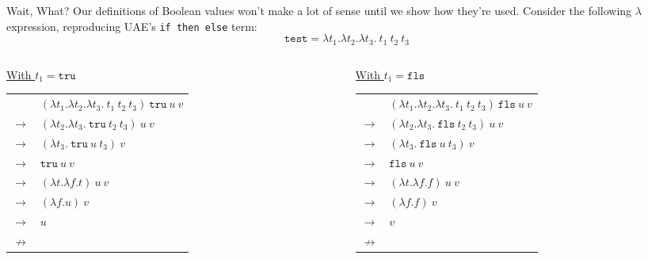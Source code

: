 \documentclass[11pt]{beamer}
\begin{document}
\begin{frame}[fragile=singleslide]{Wait, What?}
Our definitions of Boolean values won't make a lot of sense until we show how they're used.  Consider the following $\lambda$ expression, reproducing UAE's \texttt{if then else} term:
\begin{equation}
\texttt{test} = \lambda t_1. \lambda t_2. \lambda t_3.\:t_1\:t_2\:t_3
\end{equation}

\begin{columns}
\begin{column}{0.5\textwidth}
\begin{center}
\underline{With $t_1 = \texttt{tru}$}
\begin{tabular}{c l}
& $(\lambda t_1. \lambda t_2. \lambda t_3.\:t_1\:t_2\:t_3)\:\texttt{tru}\:u\:v$ \\ 
$\rightarrow$ & $(\lambda t_2.\lambda t_3.\:\texttt{tru}\:t_2\:t_3)\:u\:v$ \\
$\rightarrow$ & $(\lambda t_3.\:\texttt{tru}\:u\:t_3)\:v$ \\
$\rightarrow$ & $\texttt{tru}\:u\:v$ \\
$\rightarrow$ & $(\lambda t. \lambda f. t)\:u\:v$ \\
$\rightarrow$ & $(\lambda f. u)\:v$ \\
$\rightarrow$ & $u$ \\
$\nrightarrow$ & \\
\end{tabular}
\end{center}

\end{column}
\begin{column}{0.5\textwidth}
\begin{center}
\underline{With $t_1 = \texttt{fls}$}
\begin{tabular}{c l}
& $(\lambda t_1. \lambda t_2. \lambda t_3.\:t_1\:t_2\:t_3)\:\texttt{fls}\:u\:v$ \\ 
$\rightarrow$ & $(\lambda t_2.\lambda t_3.\:\texttt{fls}\:t_2\:t_3)\:u\:v$ \\
$\rightarrow$ & $(\lambda t_3.\:\texttt{fls}\:u\:t_3)\:v$ \\
$\rightarrow$ & $\texttt{fls}\:u\:v$ \\
$\rightarrow$ & $(\lambda t. \lambda f. f)\:u\:v$ \\
$\rightarrow$ & $(\lambda f. f)\:v$ \\
$\rightarrow$ & $v$ \\
$\nrightarrow$ & \\
\end{tabular}
\end{center}
\end{column}
\end{columns}
\end{frame}
\end{document}
